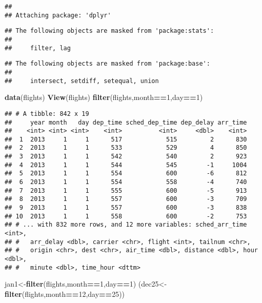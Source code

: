 \documentclass[]{article}
\newenvironment{Shaded}{\begin{snugshade}}{\end{snugshade}}
\newcommand{\DecValTok}[1]{\textcolor[rgb]{0.00,0.00,0.81}{#1}}
\newcommand{\KeywordTok}[1]{\textcolor[rgb]{0.13,0.29,0.53}{\textbf{#1}}}
\newcommand{\NormalTok}[1]{#1}
\newcommand{\OperatorTok}[1]{\textcolor[rgb]{0.81,0.36,0.00}{\textbf{#1}}}
\begin{document}
\begin{verbatim}
## 
## Attaching package: 'dplyr'
\end{verbatim}

\begin{verbatim}
## The following objects are masked from 'package:stats':
## 
##     filter, lag
\end{verbatim}

\begin{verbatim}
## The following objects are masked from 'package:base':
## 
##     intersect, setdiff, setequal, union
\end{verbatim}

\begin{Shaded}
\begin{Highlighting}[]
\KeywordTok{data}\NormalTok{(flights)}
\KeywordTok{View}\NormalTok{(flights)}
\KeywordTok{filter}\NormalTok{(flights,month}\OperatorTok{==}\DecValTok{1}\NormalTok{,day}\OperatorTok{==}\DecValTok{1}\NormalTok{)}
\end{Highlighting}
\end{Shaded}

\begin{verbatim}
## # A tibble: 842 x 19
##     year month   day dep_time sched_dep_time dep_delay arr_time
##    <int> <int> <int>    <int>          <int>     <dbl>    <int>
##  1  2013     1     1      517            515         2      830
##  2  2013     1     1      533            529         4      850
##  3  2013     1     1      542            540         2      923
##  4  2013     1     1      544            545        -1     1004
##  5  2013     1     1      554            600        -6      812
##  6  2013     1     1      554            558        -4      740
##  7  2013     1     1      555            600        -5      913
##  8  2013     1     1      557            600        -3      709
##  9  2013     1     1      557            600        -3      838
## 10  2013     1     1      558            600        -2      753
## # ... with 832 more rows, and 12 more variables: sched_arr_time <int>,
## #   arr_delay <dbl>, carrier <chr>, flight <int>, tailnum <chr>,
## #   origin <chr>, dest <chr>, air_time <dbl>, distance <dbl>, hour <dbl>,
## #   minute <dbl>, time_hour <dttm>
\end{verbatim}

\begin{Shaded}
\begin{Highlighting}[]
\NormalTok{jan1<-}\KeywordTok{filter}\NormalTok{(flights,month}\OperatorTok{==}\DecValTok{1}\NormalTok{,day}\OperatorTok{==}\DecValTok{1}\NormalTok{)}
\NormalTok{(dec25<-}\KeywordTok{filter}\NormalTok{(flights,month}\OperatorTok{==}\DecValTok{12}\NormalTok{,day}\OperatorTok{==}\DecValTok{25}\NormalTok{))}
\end{Highlighting}
\end{Shaded}
\end{document}
